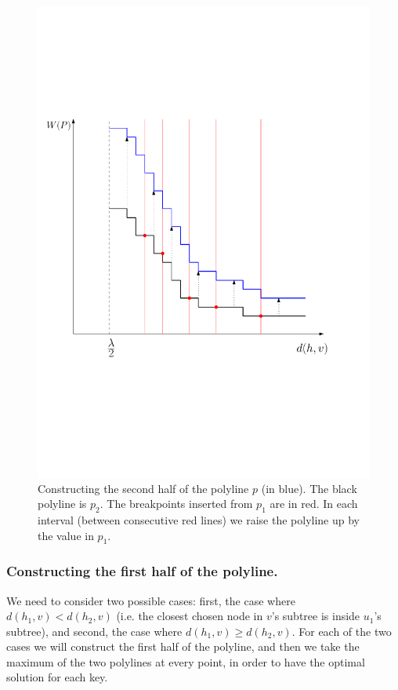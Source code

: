 \documentclass[11pt,a4paper]{article}
\theoremstyle{definition}
\theoremstyle{remark}
\begin{document}
\begin{figure}[h]
\begin{center}
\includegraphics[scale=.5]{new_polyline_second_half}
\end{center}
\caption{Constructing the second half of the polyline $p$ (in blue). The black polyline is $p_2$. The breakpoints inserted from $p_1$ are in red. In each interval (between consecutive red lines) we raise the polyline up by the value in $p_1$.%
\label{figure of constructing the second half of the polyline}}
\end{figure}

\subsubsection{Constructing the first half of the polyline.} We need to consider two possible cases: first, the case where $d(h_1,v) < d(h_2,v)$ (i.e. the closest chosen node in $v$'s subtree is inside $u_1$'s subtree), and second, the case where $d(h_1,v) \ge d(h_2,v)$. For each of the two cases we will construct the first half of the polyline, and then we take the maximum of the two polylines at every point, in order to have the optimal solution for each key.
\end{document}
